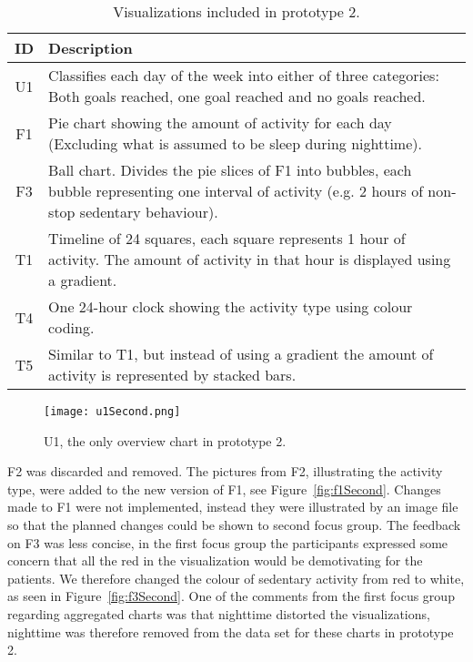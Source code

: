 \begin{table}[h!]
  \centering
  \begin{tabular}{|c|p{11cm}|}
    \hline
    \textbf{ID} & \textbf{Description} \\ \hline
    U1 & Classifies each day of the week into either of three categories: Both goals reached, one goal reached and no goals reached. \\ \hline
    F1 & Pie chart showing the amount of activity for each day (Excluding what is assumed to be sleep during nighttime). \\ \hline
    F3 & Ball chart. Divides the pie slices of F1 into bubbles, each bubble representing one interval of activity (e.g. 2 hours of non-stop sedentary behaviour). \\ \hline
    T1 & Timeline of 24 squares, each square represents 1 hour of activity. The amount of activity in that hour is displayed using a gradient. \\ \hline
    T4 & One 24-hour clock showing the activity type using colour coding. \\ \hline
    T5 & Similar to T1, but instead of using a gradient the amount of activity is represented by stacked bars. \\ \hline
  \end{tabular}
  \caption[Visualizations in the second prototype]{Visualizations included in prototype 2.}
  \label{tab:runProtDesc2}
\end{table}

\begin{figure}[h!]
  \centering
  \texttt{[image: u1Second.png]}
  \caption[Second version of U1]{U1, the only overview chart in prototype 2.}
  \label{fig:uSecond}
\end{figure}

F2 was discarded and removed. The pictures from F2, illustrating the activity type, were added to the new version of F1, see Figure~\ref{fig:f1Second}. Changes made to F1 were not implemented, instead they were illustrated by an image file so that the planned changes could be shown to second focus group. The feedback on F3 was less concise, in the first focus group the participants expressed some concern that all the red in the visualization would be demotivating for the patients. We therefore changed the colour of sedentary activity from red to white, as seen in Figure~\ref{fig:f3Second}. One of the comments from the first focus group regarding aggregated charts was that nighttime distorted the visualizations, nighttime was therefore removed from the data set for these charts in prototype 2.

